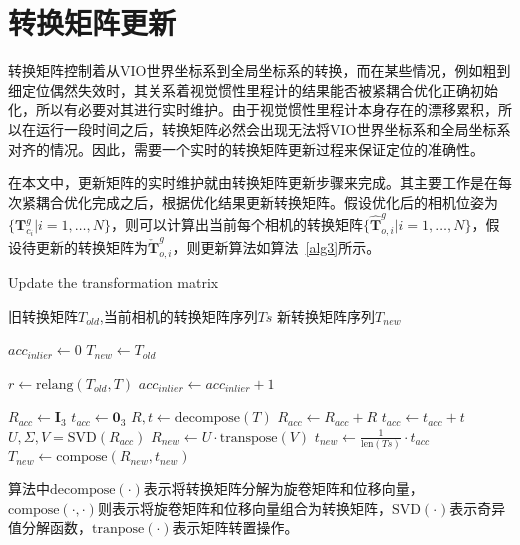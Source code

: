 \section{转换矩阵更新}

转换矩阵控制着从VIO世界坐标系到全局坐标系的转换，而在某些情况，例如粗到细定位偶然失效时，其关系着视觉惯性里程计的结果能否被紧耦合优化正确初始化，所以有必要对其进行实时维护。由于视觉惯性里程计本身存在的漂移累积，所以在运行一段时间之后，转换矩阵必然会出现无法将VIO世界坐标系和全局坐标系对齐的情况。因此，需要一个实时的转换矩阵更新过程来保证定位的准确性。

在本文中，更新矩阵的实时维护就由转换矩阵更新步骤来完成。其主要工作是在每次紧耦合优化完成之后，根据优化结果更新转换矩阵。假设优化后的相机位姿为$\{ \symbf{T}_{c_i}^g | i=1,\dots, N\}$，则可以计算出当前每个相机的转换矩阵$\{ \hat{\symbf{T}}_{o,i}^g | i=1,\dots, N\}$，假设待更新的转换矩阵为$\check{\symbf{T}}_{o,i}^g$，则更新算法如算法~\ref{alg3}所示。
\renewcommand{\algorithmicrequire}{\textbf{输入：}\unskip}
\renewcommand{\algorithmicensure}{\textbf{输出：}\unskip}
\begin{algorithm}
  \caption{Update the transformation matrix}
  \label{alg3}
  \small
  \begin{algorithmic}[1]
    \REQUIRE 旧转换矩阵$T_{old}$,当前相机的转换矩阵序列$Ts$
    \ENSURE 新转换矩阵序列$T_{new}$

    \STATE $acc_{inlier} \leftarrow 0$
    \STATE $T_{new} \leftarrow T_{old}$

      \STATE $r \leftarrow \text{relang}(T_{old}, T)$
        \STATE $acc_{inlier} \leftarrow acc_{inlier} + 1$
      \ENDIF
    \ENDFOR

      \STATE $R_{acc} \leftarrow \symbf{I}_3$
      \STATE $t_{acc} \leftarrow \symbf{0}_3$
        \STATE $R,t \leftarrow \text{decompose}(T)$
        \STATE $R_{acc} \leftarrow R_{acc} + R$
        \STATE $t_{acc} \leftarrow t_{acc} + t$
      \ENDFOR
      \STATE $U, \Sigma, V = \text{SVD}(R_{acc})$
      \STATE $R_{new} \leftarrow U\cdot \text{transpose}(V)$
      \STATE $t_{new} \leftarrow \frac{1}{\text{len}(Ts)}\cdot t_{acc}$
      \STATE $T_{new} \leftarrow \text{compose}(R_{new}, t_{new})$
    \ENDIF
  \end{algorithmic}
\end{algorithm}
算法中$\text{decompose}(\cdot)$表示将转换矩阵分解为旋卷矩阵和位移向量，$\text{compose}(\cdot, \cdot)$则表示将旋卷矩阵和位移向量组合为转换矩阵，$\text{SVD}(\cdot)$表示奇异值分解函数，$\text{tranpose}(\cdot)$表示矩阵转置操作。

